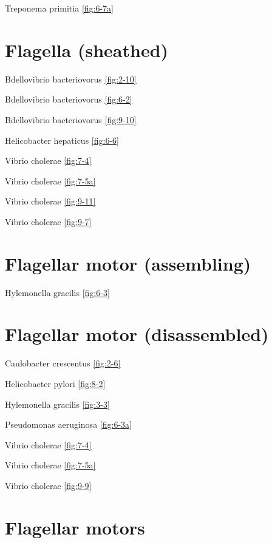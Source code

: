 \documentclass[]{tufte-book}
\begin{document}
Treponema primitia \ref{fig:6-7a}

\hypertarget{flagella-sheathed}{%
\section*{Flagella (sheathed)}\label{flagella-sheathed}}

Bdellovibrio bacteriovorus \ref{fig:2-10}

Bdellovibrio bacteriovorus \ref{fig:6-2}

Bdellovibrio bacteriovorus \ref{fig:9-10}

Helicobacter hepaticus \ref{fig:6-6}

Vibrio cholerae \ref{fig:7-4}

Vibrio cholerae \ref{fig:7-5a}

Vibrio cholerae \ref{fig:9-11}

Vibrio cholerae \ref{fig:9-7}

\hypertarget{flagellar-motor-assembling}{%
\section*{Flagellar motor (assembling)}\label{flagellar-motor-assembling}}

Hylemonella gracilis \ref{fig:6-3}

\hypertarget{flagellar-motor-disassembled}{%
\section*{Flagellar motor (disassembled)}\label{flagellar-motor-disassembled}}

Caulobacter crescentus \ref{fig:2-6}

Helicobacter pylori \ref{fig:8-2}

Hylemonella gracilis \ref{fig:3-3}

Pseudomonas aeruginosa \ref{fig:6-3a}

Vibrio cholerae \ref{fig:7-4}

Vibrio cholerae \ref{fig:7-5a}

Vibrio cholerae \ref{fig:9-9}

\hypertarget{flagellar-motors}{%
\section*{Flagellar motors}\label{flagellar-motors}}
\end{document}
